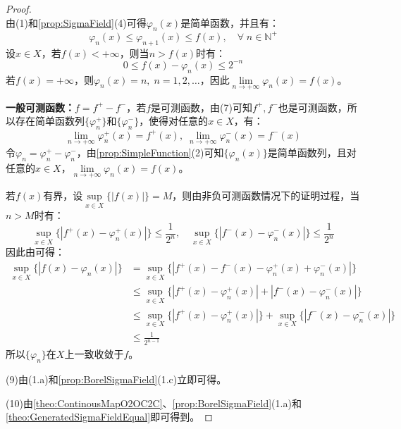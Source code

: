 \begin{proof}
\begin{equation*}
	\end{equation*}
	由(1)和\cref{prop:SigmaField}(4)可得$\varphi_n(x)$是简单函数，并且有：
	\begin{equation*}
		\varphi_n(x)\leqslant\varphi_{n+1}(x)\leqslant f(x),\quad\forall\;n\in\mathbb{N}^+
	\end{equation*}
	设$x\in X$，若$f(x)<+\infty$，则当$n>f(x)$时有：
	\begin{equation*}
		0\leqslant f(x)-\varphi_n(x)\leqslant 2^{-n}
	\end{equation*}
	若$f(x)=+\infty$，则$\varphi_n(x)=n,\;n=1,2,\dots$，因此$\lim\limits_{n\to+\infty}\varphi_n(x)=f(x)$。\par
	\textbf{一般可测函数：}$f=f^+-f^-$，若$f$是可测函数，由(7)可知$f^+,f^-$也是可测函数，所以存在简单函数列$\{\varphi_n^+\}$和$\{\varphi_n^-\}$，使得对任意的$x\in X$，有：
	\begin{equation*}
		\lim\limits_{n\to+\infty}\varphi_n^+(x)=f^+(x),\;
		\lim\limits_{n\to+\infty}\varphi_n^-(x)=f^-(x)
	\end{equation*}
	令$\varphi_n=\varphi_n^+-\varphi_n^-$，由\cref{prop:SimpleFunction}(2)可知$\{\varphi_n(x)\}$是简单函数列，且对任意的$x\in X$，$\lim\limits_{n\to+\infty}\varphi_n(x)=f(x)$。\par
	若$f(x)$有界，设$\sup\limits_{x\in X}\{|f(x)|\}=M$，则由非负可测函数情况下的证明过程，当$n>M$时有：
	\begin{equation*}
		\sup_{x\in X}\{|f^+(x)-\varphi_n^+(x)|\}\leqslant\frac{1}{2^n},\quad
		\sup_{x\in X}\{|f^-(x)-\varphi_n^-(x)|\}\leqslant\frac{1}{2^n}
	\end{equation*}
	因此由可得：
	\begin{align*}
		\sup_{x\in X}\{|f(x)-\varphi_n(x)|\}
		&=\sup_{x\in X}\{|f^+(x)-f^-(x)-\varphi_n^+(x)+\varphi_n^-(x)|\} \\
		&\leqslant\sup_{x\in X}\{|f^+(x)-\varphi_n^+(x)|+|f^-(x)-\varphi_n^-(x)|\} \\
		&\leqslant\sup_{x\in X}\{|f^+(x)-\varphi_n^+(x)|\}+\sup_{x\in X}\{|f^-(x)-\varphi_n^-(x)|\} \\
		&\leqslant\frac{1}{2^{n-1}}
	\end{align*}
	所以$\{\varphi_n\}$在$X$上一致收敛于$f$。\par
	(9)由(1.a)和\cref{prop:BorelSigmaField}(1.c)立即可得。\par
	(10)由\cref{theo:ContinousMapO2OC2C}、\cref{prop:BorelSigmaField}(1.a)和\cref{theo:GeneratedSigmaFieldEqual}即可得到。
\end{proof}

